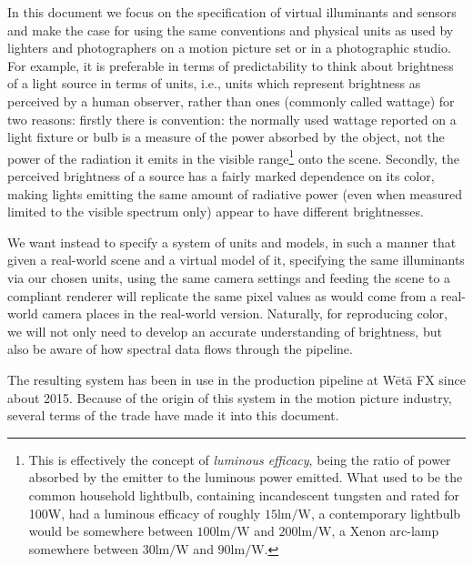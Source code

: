 In this document we focus on the specification of \gls{virtual} \glspl{illuminant} and
\glspl{sensor} and make the case for using the same conventions and physical units as
used by lighters and photographers on a motion picture set or in a photographic studio. 
For example, it is preferable in terms of predictability to think about brightness of a 
light source in terms of  units, i.e., units which represent brightness as
perceived by a \gls{human observer}, rather than  ones 
(commonly called \gls{wattage}) for two reasons: 
firstly there is convention: the normally used wattage reported on a light fixture or bulb 
is a measure of the power absorbed by the object, not the power of the radiation it emits in the visible range\footnote{This is effectively the concept of  
	\textsl{\gls{luminous efficacy}}, being the ratio of power absorbed by the emitter
	to the luminous power emitted. 
	What used to be the common household lightbulb, containing incandescent tungsten and 
	rated for 100W, had a luminous efficacy of roughly $15\unit{\lumen\per\watt}$, 
	a contemporary  lightbulb would be somewhere between 
	$100\unit{\lumen\per\watt}$ and $200\unit{\lumen\per\watt}$, 
	a Xenon arc-lamp somewhere between $30\unit{\lumen\per\watt}$ and
	$90\unit{\lumen\per\watt}$.} onto the \gls{scene}. 
Secondly, the perceived \gls{brightness} of a source has a fairly marked dependence on 
its color, making lights emitting the same amount of radiative power (even when measured 
limited to the visible spectrum only) appear to have different brightnesses. 

We want instead to specify a system of units and models, in such a manner that
given a real-world scene and a virtual model of it,
specifying the same illuminants via our chosen units, using the same
camera settings and feeding the scene to a compliant renderer will replicate 
the same pixel values as would come from a real-world camera places in the 
real-world version. 
Naturally, for reproducing color, we will not only need
to develop an accurate understanding of brightness, but also be aware
of how \gls{spectral} data flows through the \gls{pipeline}.



The resulting system has been in use in the
production pipeline at W\=et\=a FX since about 2015.
Because of the origin of this system in the motion picture industry,
several terms of the trade have made it into this document. 


